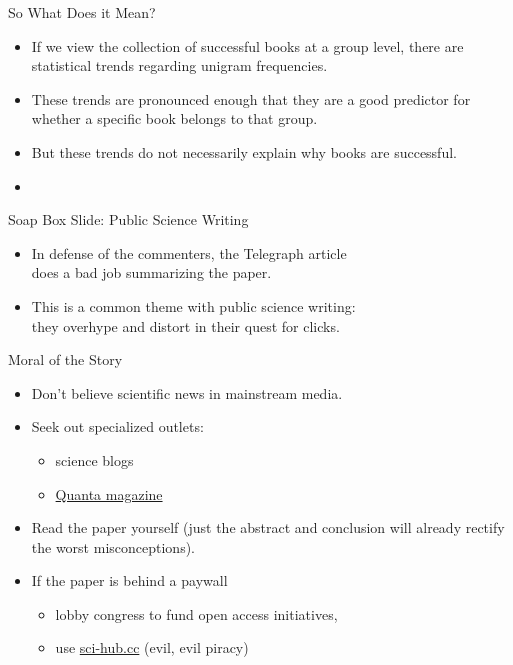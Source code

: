\documentclass[professionalfonts, xcolor={usenames,svgnames,x11names,table}]{beamer}
\begin{document}
\begin{frame}{So What Does it Mean?}
    \begin{itemize}
        \item If we view the collection of successful books at a group level, there are statistical trends regarding unigram frequencies.
        \item These trends are pronounced enough that they are a good predictor for whether a specific book belongs to that group.
        \item But these trends do not necessarily explain why books are successful.
        \item {}
    \end{itemize}
\end{frame}

\begin{frame}{Soap Box Slide: Public Science Writing}
    \begin{itemize}
        \item In defense of the commenters, the Telegraph article\\
            does a bad job summarizing the paper.
        \item This is a common theme with public science writing:\\
            they overhype and distort in their quest for clicks.
    \end{itemize}

    \begin{block}{Moral of the Story}
        \begin{itemize}
            \item Don't believe scientific news in mainstream media.
            \item Seek out specialized outlets:
                \begin{itemize}
                    \item science blogs
                    \item \href{https://www.quantamagazine.org/}{Quanta magazine}
                \end{itemize}
            \item Read the paper yourself (just the abstract and conclusion will already rectify the worst misconceptions).
            \item If the paper is behind a paywall
                \begin{itemize}
                    \item lobby congress to fund open access initiatives,
                    \item use \url{sci-hub.cc} (evil, evil piracy)
                \end{itemize}
        \end{itemize}
    \end{block}
\end{frame}
\end{document}
